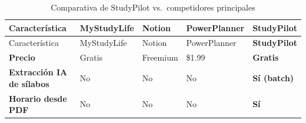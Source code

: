 \documentclass[
  spanish,
  11pt,
  a4paper,
]{article}
\begin{document}
\begin{longtable}[]{@{}
  >{\raggedright\arraybackslash}p{}
  >{\raggedright\arraybackslash}p{}
  >{\raggedright\arraybackslash}p{}
  >{\raggedright\arraybackslash}p{}
  >{\raggedright\arraybackslash}p{}@{}}
\caption{Comparativa de StudyPilot vs.~competidores
principales}\tabularnewline
\toprule\noalign{}
\begin{minipage}[b]{\linewidth}\raggedright
Característica
\end{minipage} & \begin{minipage}[b]{\linewidth}\raggedright
MyStudyLife
\end{minipage} & \begin{minipage}[b]{\linewidth}\raggedright
Notion
\end{minipage} & \begin{minipage}[b]{\linewidth}\raggedright
PowerPlanner
\end{minipage} & \begin{minipage}[b]{\linewidth}\raggedright
\textbf{StudyPilot}
\end{minipage} \\
\midrule\noalign{}
\endfirsthead
\toprule\noalign{}
\begin{minipage}[b]{\linewidth}\raggedright
Característica
\end{minipage} & \begin{minipage}[b]{\linewidth}\raggedright
MyStudyLife
\end{minipage} & \begin{minipage}[b]{\linewidth}\raggedright
Notion
\end{minipage} & \begin{minipage}[b]{\linewidth}\raggedright
PowerPlanner
\end{minipage} & \begin{minipage}[b]{\linewidth}\raggedright
\textbf{StudyPilot}
\end{minipage} \\
\midrule\noalign{}
\endhead
\bottomrule\noalign{}
\endlastfoot
\textbf{Precio} & Gratis & Freemium & \$1.99 & \textbf{Gratis} \\
\textbf{Extracción IA de sílabos} & No & No & No & \textbf{Sí
(batch)} \\
\textbf{Horario desde PDF} & No & No & No & \textbf{Sí} \\

\end{longtable}
\end{document}
